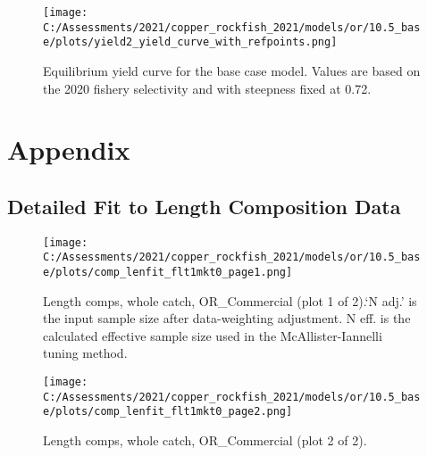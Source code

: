 \documentclass[11pt,
  english,
  a4paper,
]{article}
\begin{document}
\tagmcend\tagstructend

\clearpage


\begin{figure}
\centering
\texttt{[image: C:/Assessments/2021/copper\_rockfish\_2021/models/or/10.5\_base/plots/yield2\_yield\_curve\_with\_refpoints.png]}
\caption{Equilibrium yield curve for the base case model. Values are based on the 2020 fishery selectivity and with steepness fixed at 0.72.\label{fig:yield}}
\end{figure}

\tagmcend\tagstructend

\clearpage


\hypertarget{appendix}{%
\section{Appendix}\label{appendix}}

\leavevmode\tagmcend\tagstructend


\hypertarget{length-fit}{%
\subsection{Detailed Fit to Length Composition Data}\label{length-fit}}

\leavevmode\tagmcend\tagstructend


\begin{figure}
\centering
\texttt{[image: C:/Assessments/2021/copper\_rockfish\_2021/models/or/10.5\_base/plots/comp\_lenfit\_flt1mkt0\_page1.png]}
\caption{Length comps, whole catch, OR\_Commercial (plot 1 of 2).`N adj.' is the input sample size after data-weighting adjustment. N eff. is the calculated effective sample size used in the McAllister-Iannelli tuning method.\label{fig:comp_lenfit_flt1mkt0_page1}}
\end{figure}

\tagmcend\tagstructend


\begin{figure}
\centering
\texttt{[image: C:/Assessments/2021/copper\_rockfish\_2021/models/or/10.5\_base/plots/comp\_lenfit\_flt1mkt0\_page2.png]}
\caption{Length comps, whole catch, OR\_Commercial (plot 2 of 2).\label{fig:comp_lenfit_flt1mkt0_page2}}
\end{figure}
\end{document}
